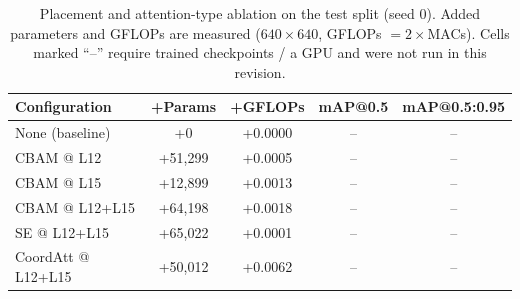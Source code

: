 \begin{table}[!t]
\centering
\caption{Placement and attention-type ablation on the test split (seed 0). Added parameters and GFLOPs are measured
($640\times640$, GFLOPs $=2\times$MACs). Cells marked ``--'' require trained checkpoints / a GPU and were not run in this revision.}
\label{tab:placement}
\setlength{\tabcolsep}{2.5pt}
\begin{tabular}{lcccc}
\toprule
Configuration & +Params & +GFLOPs & mAP@0.5 & mAP@0.5:0.95 \\
\midrule
None (baseline) & +0 & +0.0000 & -- & -- \\
CBAM @ L12 & +51,299 & +0.0005 & -- & -- \\
CBAM @ L15 & +12,899 & +0.0013 & -- & -- \\
CBAM @ L12+L15 & +64,198 & +0.0018 & -- & -- \\
SE @ L12+L15 & +65,022 & +0.0001 & -- & -- \\
CoordAtt @ L12+L15 & +50,012 & +0.0062 & -- & -- \\
\bottomrule
\end{tabular}
\end{table}

